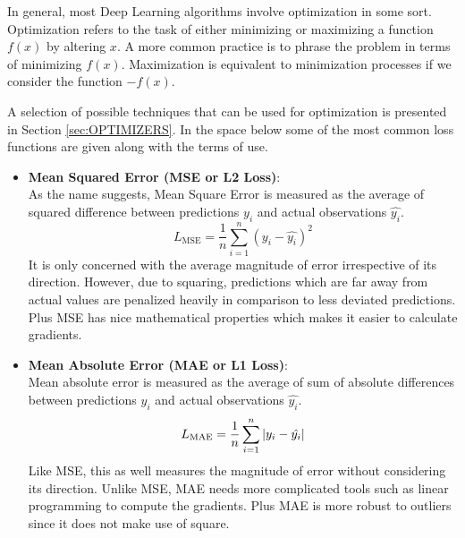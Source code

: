 In general, most Deep Learning algorithms involve optimization in some sort. Optimization refers to the task of either minimizing or maximizing a function $f(x)$ by altering $x$. A more common practice is to phrase the problem in terms of minimizing $f(x)$. Maximization is equivalent to minimization processes if we consider the function $-f(x)$.

A selection of possible techniques that can be used for optimization is presented in Section \ref{sec:OPTIMIZERS}. In the space below some of the most common loss functions are given along with the terms of use.


\begin{itemize}
    \item \textbf{Mean Squared Error (MSE or L2 Loss)}:\\
    As the name suggests, Mean Square Error is measured as the average of squared difference between predictions $y_i$ and actual observations $\hat{y_i}$.
    \begin{equation}
        L_{\mathrm{MSE}} = \frac{1}{n} \sum_{i=1}^{n} (y_i - \hat{y_i})^2
    \end{equation}
    It is only concerned with the average magnitude of error irrespective of its direction. However, due to squaring, predictions which are far away from actual values are penalized heavily in comparison to less deviated predictions. Plus MSE has nice mathematical properties which makes it easier to calculate gradients.
    
    \item \textbf{Mean Absolute Error (MAE or L1 Loss)}:\\
    Mean absolute error is measured as the average of sum of absolute differences between predictions $y_i$ and actual observations $\hat{y_i}$.
    \begin{equation}
        L_{\mathrm{MAE}} = \frac{1}{n} \sum_{i=1}^{n} \left| y_i - \hat{y_i} \right|
    \end{equation}
    Like MSE, this as well measures the magnitude of error without considering its direction. Unlike MSE, MAE needs more complicated tools such as linear programming to compute the gradients. Plus MAE is more robust to outliers since it does not make use of square.
    

\end{itemize}
